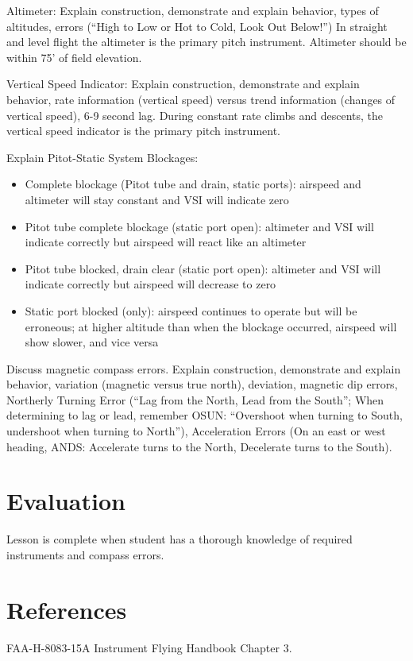 \documentclass[twoside,openright]{report}
\begin{document}
Altimeter: Explain construction, demonstrate and explain behavior, types of
altitudes, errors (``High to Low or Hot to Cold, Look Out Below!'') In straight
and level flight the altimeter is the primary pitch instrument. Altimeter
should be within 75' of field elevation.

Vertical Speed Indicator: Explain construction, demonstrate and explain
behavior, rate information (vertical speed) versus trend information (changes
of vertical speed), 6-9 second lag. During constant rate climbs and descents,
the vertical speed indicator is the primary pitch instrument.

Explain Pitot-Static System Blockages:
\begin{itemize}
  \item Complete blockage (Pitot tube and drain, static ports): airspeed and
    altimeter will stay constant and VSI will indicate zero

  \item Pitot tube complete blockage (static port open): altimeter and VSI will
    indicate correctly but airspeed will react like an altimeter

  \item Pitot tube blocked, drain clear (static port open): altimeter and VSI
    will indicate correctly but airspeed will decrease to zero

  \item Static port blocked (only): airspeed continues to operate but will be
    erroneous; at higher altitude than when the blockage occurred, airspeed
    will show slower, and vice versa
\end{itemize}

Discuss magnetic compass errors. Explain construction, demonstrate and explain
behavior, variation (magnetic versus true north), deviation, magnetic dip
errors, Northerly Turning Error (``Lag from the North, Lead from the South'';
When determining to lag or lead, remember OSUN: ``Overshoot when turning to
South, undershoot when turning to North''), Acceleration Errors (On an east or
west heading, ANDS: Accelerate turns to the North, Decelerate turns to the
South).

\section{Evaluation}

Lesson is complete when student has a thorough knowledge of required
instruments and compass errors.

\section{References}

FAA-H-8083-15A Instrument Flying Handbook Chapter 3.
\end{document}
